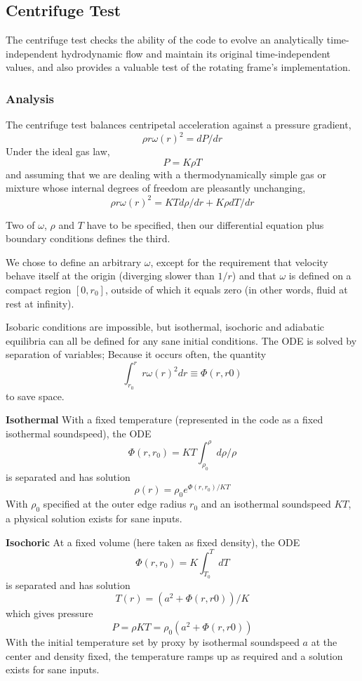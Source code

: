 

\subsection{Centrifuge Test}

The centrifuge test checks the ability of the code to evolve an analytically time-independent
hydrodynamic flow and maintain its original time-independent values, and also provides a
valuable test of the rotating frame's implementation.

\subsubsection{Analysis}

The centrifuge test balances centripetal acceleration against a pressure gradient,
\[ \rho r \omega(r)^2 = dP/dr \]
Under the ideal gas law,
\[ P = K \rho T \]
and assuming that we are dealing with a thermodynamically simple gas or mixture whose 
internal degrees of freedom are pleasantly unchanging,
\[ \rho r \omega(r)^2 = K T d\rho/dr + K \rho dT/dr \]

Two of $\omega$, $\rho$ and $T$ have to be specified, then our differential equation
plus boundary conditions defines the third.

We chose to define an arbitrary $\omega$, except for the requirement that velocity behave
itself at the origin (diverging slower than $1/r$) and that $\omega$ is defined on a
compact region $[0, r_0]$, outside of which it equals zero (in other words, fluid at rest
at infinity).

Isobaric conditions are impossible, but isothermal, isochoric and adiabatic equilibria
can all be defined for any sane initial conditions. The ODE is solved by separation
of variables; Because it occurs often, the quantity
\[ \int_{r_0}^r r \omega(r)^2 dr \equiv \Phi(r,r0) \]
to save space.

\textbf{Isothermal}
With a fixed temperature (represented in the code as a fixed isothermal soundspeed), the ODE
\[ \Phi(r,r_0) = K T \int_{\rho_0}^\rho d\rho / \rho \]
is separated and has solution
\[ \rho(r)  = \rho_0 e^{\Phi(r,r_0)/KT} \]
With $\rho_0$ specified at the outer edge radius $r_0$ and an isothermal soundspeed $KT$,
a physical solution exists for sane inputs.

\textbf{Isochoric}
At a fixed volume (here taken as fixed density), the ODE
\[ \Phi(r,r_0) = K \int_{T_0}^T dT \]
is separated and has solution
\[ T(r) = (a^2 + \Phi(r,r0))/K \]
which gives pressure
\[ P = \rho K T = \rho_0 (a^2 + \Phi(r,r0)) \]
With the initial temperature set by proxy by isothermal soundspeed $a$ at the center
and density fixed, the temperature ramps up as required and a solution exists for sane
inputs.

